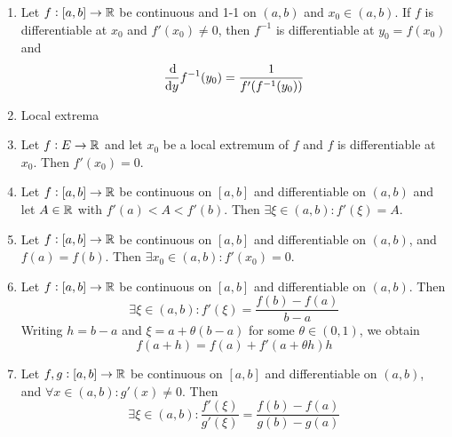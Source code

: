 \documentclass{styles/note}
\begin{document}
  \begin{enumerate}[label=(\alph*)]
    \item Let $f : [a, b] \to \mathbb{R}$ be continuous and 1-1 on $(a, b)$ and $x_0 \in (a, b)$. If $f$ is differentiable at $x_0$ and $f'(x_0) \neq 0$, then $f^{-1}$ is differentiable at $y_0 = f(x_0)$ and
      \begin{equation}
        \frac{\dif}{\dif y} f^{-1}(y_0) = \frac{1}{f'(f^{-1}(y_0))}
      \end{equation}
    
    \item Local extrema
    
    \item {} Let $f : E \to \mathbb{R}$ and let $x_0$ be a local extremum of $f$ and $f$ is differentiable at $x_0$. Then $f'(x_0) = 0$.
    
    \item {} Let $f : [a, b] \to \mathbb{R}$ be continuous on $[a, b]$ and differentiable on $(a, b)$ and let $A \in \mathbb{R}$ with $f'(a) < A < f'(b)$. Then $\exists \xi \in (a, b) : f'(\xi) = A$.
    
    \item {} Let $f : [a, b] \to \mathbb{R}$ be continuous on $[a, b]$ and differentiable on $(a, b)$, and $f(a) = f(b)$. Then $\exists x_0 \in (a, b) : f'(x_0) = 0$.
    
    \item {}
      Let $f : [a, b] \to \mathbb{R}$ be continuous on $[a, b]$ and differentiable on $(a, b)$. Then
      \begin{equation}
        \exists \xi \in (a, b) : f'(\xi) = \frac{f(b) - f(a)}{b - a}
      \end{equation}
      Writing $h = b - a$ and $\xi = a + \theta(b - a)$ for some $\theta \in (0, 1)$, we obtain
      \begin{equation}
        f(a + h) = f(a) + f'(a + \theta h) h
      \end{equation}
    
    \item {}
      Let $f, g : [a, b] \to \mathbb{R}$ be continuous on $[a, b]$ and differentiable on $(a, b)$, and $\forall x \in (a, b) : g'(x) \neq 0$. Then
      \begin{equation}
        \exists \xi \in (a, b) : \frac{f'(\xi)}{g'(\xi)} = \frac{f(b) - f(a)}{g(b) - g(a)}
      \end{equation}
  \end{enumerate}
\end{document}
